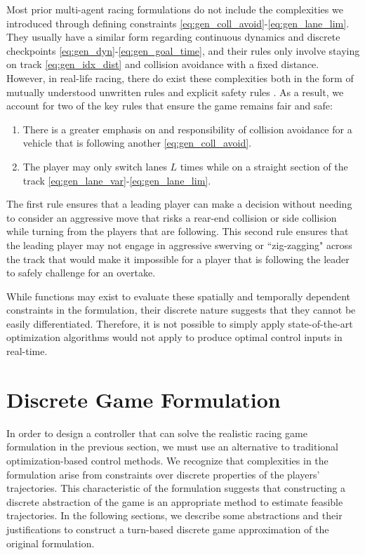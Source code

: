 Most prior multi-agent racing formulations \cite{Wang2019, Wang2021, Li2021} do not include the complexities we introduced through defining constraints \eqref{eq:gen_coll_avoid}-\eqref{eq:gen_lane_lim}. They usually have a similar form regarding continuous dynamics and discrete checkpoints \eqref{eq:gen_dyn}-\eqref{eq:gen_goal_time}, and their rules only involve staying on track \eqref{eq:gen_idx_dist} and collision avoidance with a fixed distance. However, in real-life racing, there do exist these complexities both in the form of mutually understood unwritten rules and explicit safety rules \cite{racingrules}. As a result, we account for two of the key rules that ensure the game remains fair and safe:
\begin{enumerate}
    \item There is a greater emphasis on and responsibility of collision avoidance for a vehicle that is following another \eqref{eq:gen_coll_avoid}.
    \item The player may only switch lanes $L$ times while on a straight section of the track \eqref{eq:gen_lane_var}-\eqref{eq:gen_lane_lim}.
\end{enumerate}

The first rule ensures that a leading player can make a decision without needing to consider an aggressive move that risks a rear-end collision or side collision while turning from the players that are following. This second rule ensures that the leading player may not engage in aggressive swerving or ``zig-zagging" across the track that would make it impossible for a player that is following the leader to safely challenge for an overtake. 

While functions may exist to evaluate these spatially and temporally dependent constraints in the formulation, their discrete nature suggests that they cannot be easily differentiated. Therefore, it is not possible to simply apply state-of-the-art optimization algorithms would not apply to produce optimal control inputs in real-time. 

\section{Discrete Game Formulation}
In order to design a controller that can solve the realistic racing game formulation in the previous section, we must use an alternative to traditional optimization-based control methods. We recognize that complexities in the formulation arise from constraints over discrete properties of the players' trajectories. This characteristic of the formulation suggests that constructing a discrete abstraction of the game is an appropriate method to estimate feasible trajectories. In the following sections, we describe some abstractions and their justifications to construct a turn-based discrete game approximation of the original formulation. 

